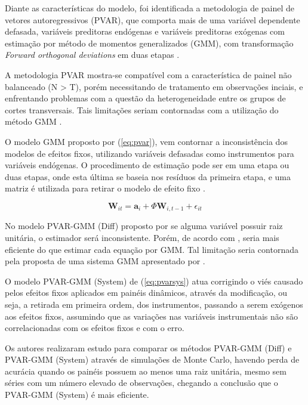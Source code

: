 \documentclass[
  12pt,
  12pt,
  openright,
  oneside,
  a4paper,
  chapter=TITLE,
  section=TITLE,
  subsection=TITLE,
  subsubsection=TITLE,
  english,
  portugues,
  sumario=tradicional]{abntex2}
\begin{document}
Diante as características do modelo, foi identificada a metodologia de painel de vetores autoregressivos (PVAR), que comporta mais de uma variável dependente defasada, variáveis preditoras endógenas e variáveis preditoras exógenas com estimação por método de momentos generalizados (GMM), com transformação \emph{Forward orthogonal deviations} em duas etapas \cite{sigmund:2008}.

A metodologia PVAR mostra-se compatível com a característica de painel não balanceado (N \textgreater{} T), porém necessitando de tratamento em observações inciais, e enfrentando problemas com a questão da heterogeneidade entre os grupos de cortes transversais. Tais limitações seriam contornadas com a utilização do método GMM \cite{holtz-eakin:1988}.

O modelo GMM proposto por \textcite{arellanobond:1991} (\autoref{eq:pvar}), vem contornar a inconsistência dos modelos de efeitos fixos, utilizando variáveis defasadas como instrumentos para variáveis endógenas. O procedimento de estimação pode ser em uma etapa ou duas etapas, onde esta última se baseia nos resíduos da primeira etapa, e uma matriz é utilizada para retirar o modelo de efeito fixo \cite{sigmund:2008}.

\begin{equation}\label{eq:pvar}
\mathbf{W}_{it} = \mathbf{a}_{i} + \Phi \mathbf{W}_{i, t-1} + \epsilon_{it}  
\end{equation}

No modelo PVAR-GMM (Diff) proposto por \textcite{arellanobond:1991} se alguma variável possuir raiz unitária, o estimador será inconsistente. Porém, de acordo com \textcite{binder:2005}, seria mais eficiente do que estimar cada equação por GMM. Tal limitação seria contornada pela proposta de uma sistema GMM apresentado por \textcite{blundelbond:1998}.

O modelo PVAR-GMM (System) de \textcite{blundelbond:1998} (\autoref{eq:pvarsys}) atua corrigindo o viés causado pelos efeitos fixos aplicados em painéis dinâmicos, através da modificação, ou seja, a retirada em primeira ordem, dos instrumentos, passando a serem exógenos aos efeitos fixos, assumindo que as variações nas variáveis instrumentais não são correlacionadas com os efeitos fixos e com o erro.

Os autores \textcite{binder:2005} realizaram estudo para comparar os métodos PVAR-GMM (Diff) e PVAR-GMM (System) através de simulações de Monte Carlo, havendo perda de acurácia quando os painéis possuem ao menos uma raiz unitária, mesmo sem séries com um número elevado de observações, chegando a conclusão que o PVAR-GMM (System) é mais eficiente.
\end{document}

